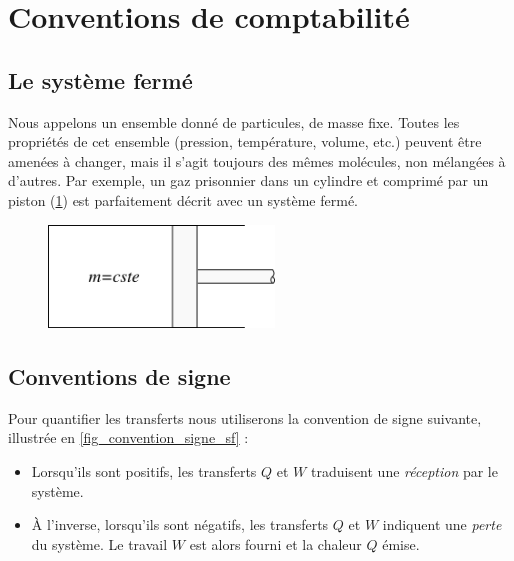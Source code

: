 \section{Conventions de comptabilité}

	\subsection{Le système fermé}

			Nous appelons  un ensemble donné de particules, de masse fixe. Toutes les propriétés de cet ensemble (pression, température, volume, etc.) peuvent être amenées à changer, mais il s’agit toujours des mêmes molécules, non mélangées à d’autres. Par exemple, un gaz prisonnier dans un cylindre et comprimé par un piston (\cref{fig_piston_m_cste}) est parfaitement décrit avec un système fermé.

		\begin{figure}
			\begin{center}
			\includegraphics[width=6cm]{images/piston_cylindre.png}
			\end{center}
			\label{fig_piston_m_cste}
		\end{figure}

	\subsection{Conventions de signe} 
	\label{ch_convention_signe_sf}

		Pour quantifier les transferts nous utiliserons la convention de signe suivante, illustrée en \cref{fig_convention_signe_sf} :

		\begin{itemize}
			\item Lorsqu’ils sont positifs, les transferts $Q$ et $W$ traduisent une \emph{réception} par le système.
			\item À l’inverse, lorsqu’ils sont négatifs, les transferts $Q$ et $W$ indiquent une \emph{perte} du système. Le travail $W$ est alors fourni et la chaleur $Q$ émise.
		\end{itemize}

